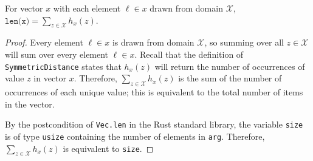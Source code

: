 \documentclass{article}
\begin{document}
\begin{lemma}
    \label{lemma:len-sum-equiv}
    For vector $x$ with each element $\ell\in x$ drawn from domain $\mathcal{X}$, $\texttt{len(x)} = \sum_{z\in\mathcal{X}} h_x(z)$.
\end{lemma}

\begin{proof}
    Every element $\ell \in x$ is drawn from domain $\mathcal{X}$, so summing over all $z\in \mathcal{X}$ will sum over every element $\ell\in x$.
    Recall that the definition of \texttt{SymmetricDistance} states that $h_x(z)$ will return the number of occurrences of value $z$ in vector $x$.
    Therefore, $\sum_{z\in\mathcal{X}} h_x(z)$ is the sum of the number of occurrences of each unique value;
    this is equivalent to the total number of items in the vector.

    By the postcondition of \texttt{Vec.len} in the Rust standard library,
    the variable \texttt{size} is of type \texttt{usize} containing the number of elements in \texttt{arg}.
    Therefore, $\sum_{z\in\mathcal{X}} h_x(z)$ is equivalent to \texttt{size}.
\end{proof}
\end{document}

